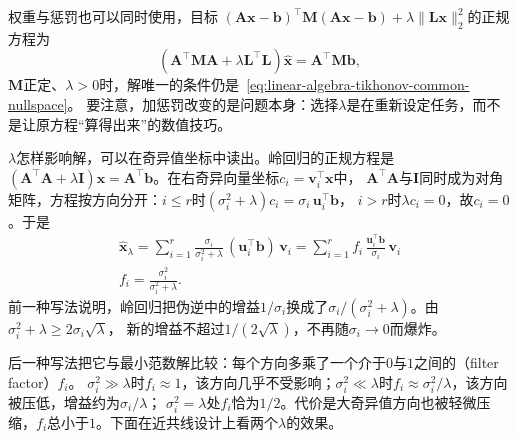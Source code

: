 权重与惩罚也可以同时使用，目标
$(\bm A\bm x-\bm b)^\top\bm M(\bm A\bm x-\bm b)+\lambda\lVert\bm L\bm x\rVert_2^2$的正规方程为
\begin{equation}
 (\bm A^\top\bm M\bm A+\lambda\bm L^\top\bm L)\hat{\bm x}=\bm A^\top\bm M\bm b,
 \label{eq:ls-general-normal-equations}
\end{equation}
$\bm M$正定、$\lambda>0$时，解唯一的条件仍是~\eqref{eq:linear-algebra-tikhonov-common-nullspace}。
要注意，加惩罚改变的是问题本身：选择$\lambda$是在重新设定任务，而不是让原方程“算得出来”的数值技巧。

$\lambda$怎样影响解，可以在奇异值坐标中读出。岭回归的正规方程是$(\bm A^\top\bm A+\lambda\bm I)\bm x=\bm A^\top\bm b$。在右奇异向量坐标$c_i=\bm v_i^\top\bm x$中，
$\bm A^\top\bm A$与$\bm I$同时成为对角矩阵，方程按方向分开：$i\leq r$时$(\sigma_i^2+\lambda)c_i=\sigma_i\,\bm u_i^\top\bm b$，
$i>r$时$\lambda c_i=0$，故$c_i=0$。于是
\begin{equation}
\begin{gathered}
\hat{\bm x}_\lambda=\sum_{i=1}^r\frac{\sigma_i}{\sigma_i^2+\lambda}\,(\bm u_i^\top\bm b)\,\bm v_i
 =\sum_{i=1}^r f_i\,\frac{\bm u_i^\top\bm b}{\sigma_i}\,\bm v_i\\
f_i=\frac{\sigma_i^2}{\sigma_i^2+\lambda}.
\end{gathered}
\label{eq:matrix-analysis-ridge-filter-factor}
\end{equation}
前一种写法说明，岭回归把伪逆中的增益$1/\sigma_i$换成了$\sigma_i/(\sigma_i^2+\lambda)$。由$\sigma_i^2+\lambda\geq2\sigma_i\sqrt\lambda$，
新的增益不超过$1/(2\sqrt\lambda)$，不再随$\sigma_i\to0$而爆炸。

后一种写法把它与最小范数解比较：每个方向多乘了一个介于$0$与$1$之间的（filter factor）$f_i$。
$\sigma_i^2\gg\lambda$时$f_i\approx1$，该方向几乎不受影响；$\sigma_i^2\ll\lambda$时$f_i\approx\sigma_i^2/\lambda$，该方向被压低，增益约为$\sigma_i/\lambda$；
$\sigma_i^2=\lambda$处$f_i$恰为$1/2$。代价是大奇异值方向也被轻微压缩，$f_i$总小于$1$。下面在近共线设计上看两个$\lambda$的效果。

